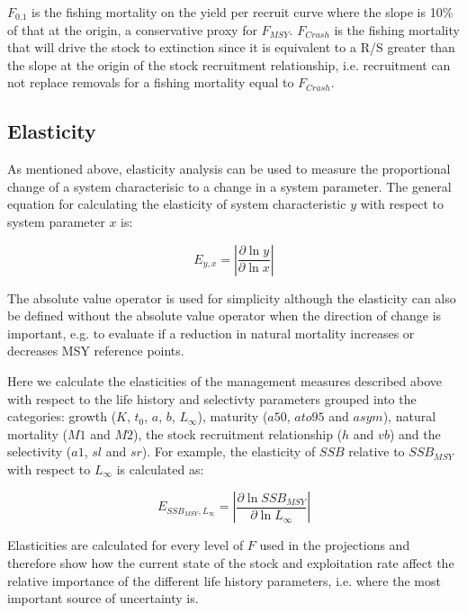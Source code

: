 \documentclass[%
nonumbib,      %
%
]{nrc1}                          %
\begin{document}
$F_{0.1}$ is the fishing mortality on the yield per recruit curve where the slope is 10\%  of that at the origin, a conservative proxy for $F_{MSY}$.
$F_{Crash}$ is the fishing mortality that will drive the stock to extinction since it is equivalent to a R/S greater than the slope at the origin of
the stock recruitment relationship, i.e. recruitment can not replace removals for a fishing mortality equal to $F_{Crash}$.  

\subsection{Elasticity}
As mentioned above, elasticity analysis can be used to measure the proportional change of a system characterisic to a change in a system parameter. 
The general equation for calculating the elasticity of system characteristic $y$ with respect to system parameter $x$ is:

\begin{equation}
E_{y,x} = \left| \frac{\partial \ln y}{\partial \ln x} \right|        
%
\end{equation} 

The absolute value operator is used for simplicity although the elasticity can also be defined without the absolute value operator when the direction of 
change is important, e.g. to evaluate if a reduction in natural mortality increases or decreases MSY reference points.	

Here we calculate the elasticities of the management measures described above with respect to the life history and selectivty parameters grouped into the
categories: growth ($K$, $t_0$, $a$, $b$, $L_{\infty}$), maturity ($a50$, $ato95$ and $asym$), natural mortality ($M1$ and $M2$), the stock recruitment
relationship ($h$ and $vb$) and the selectivity ($a1$, $sl$ and $sr$). For example, the elasticity of $SSB$ relative to $SSB_{MSY}$ with respect to $L_{\infty}$ is calculated as:

\begin{equation}
E_{SSB_{MSY},L_{\infty}} = \left| \frac{\partial \ln SSB_{MSY}}{\partial \ln L_{\infty}} \right|
\end{equation}

Elasticities are calculated for every level of $F$ used in the projections and therefore show how the current state of the stock and exploitation rate
affect the relative importance of the different life history parameters, i.e. where the most important source of uncertainty is.
\end{document}
